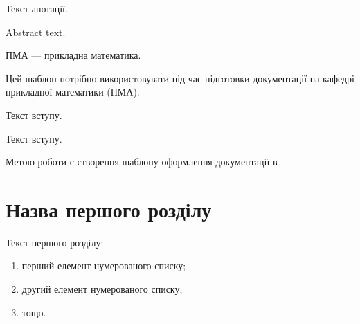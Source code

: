 \documentclass{xedstu}
\begin{document}

\abstractUkr
Текст анотації.

\abstractEng
Abstract text.

\tableofcontents

\shortings
ПМА --- прикладна математика.

\intro
Цей шаблон потрібно використовувати під час підготовки документації на кафедрі прикладної математики (ПМА). 

Текст вступу.

Текст вступу.

\goal
Метою роботи є створення шаблону оформлення документації в \XeLaTeX

\chapter{Назва першого розділу}
\label{chap:first}

Текст першого розділу:
\begin{enumerate}
	\item перший елемент нумерованого списку;
	\item другий елемент нумерованого списку;
	\item тощо.
\end{enumerate}
\end{document}
